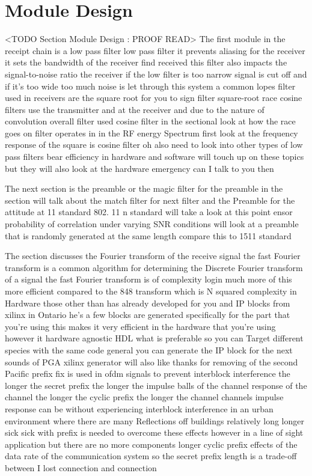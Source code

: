\section{Module Design}
	<TODO Section Module Design : PROOF READ>
The first module in the receipt chain is a low pass filter low pass filter it prevents aliasing for the receiver it sets the bandwidth of the receiver find received this filter also impacts the signal-to-noise ratio the receiver if the low filter is too narrow signal is cut off and if it's too wide too much noise is let through this system a common lopes filter used in receivers are the square root for you to sign filter square-root race cosine filters use the transmitter and at the receiver and due to the nature of convolution overall filter used cosine filter in the sectional look at how the race goes on filter operates in in the RF energy Spectrum first look at the frequency response of the square is cosine filter oh also need to look into other types of low pass filters bear efficiency in hardware and software will touch up on these topics but they will also look at the hardware emergency can I talk to you then

The next section is the preamble or the magic filter for the preamble in the section will talk about the match filter for next filter and the Preamble for the attitude at 11 standard 802. 11 n standard will take a look at this point ensor probability of correlation under varying SNR conditions will look at a preamble that is randomly generated at the same length compare this to 1511 standard

The section discusses the Fourier transform of the receive signal the fast Fourier transform is a common algorithm for determining the Discrete Fourier transform of a signal the fast Fourier transform is of complexity login much more of this more efficient compared to the 848 transform which is N squared complexity in Hardware those other than has already developed for you and IP blocks from xilinx in Ontario he's a few blocks are generated specifically for the part that you're using this makes it very efficient in the hardware that you're using however it hardware agnostic HDL what is preferable so you can Target different species with the same code general you can generate the IP block for the next sounds of PGA xilinx generator will also like thanks for removing of the second Pacific prefix fix is used in ofdm signals to prevent interblock interference the longer the secret prefix the longer the impulse balls of the channel response of the channel the longer the cyclic prefix the longer the channel channels impulse response can be without experiencing interblock interference in an urban environment where there are many Reflections off buildings relatively long longer sick sick with prefix is needed to overcome these effects however in a line of sight application but there are no more components longer cyclic prefix effects of the data rate of the communication system so the secret prefix length is a trade-off between I lost connection and connection

